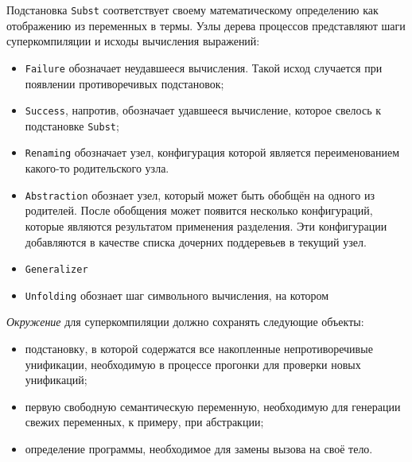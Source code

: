 Подстановка \lstinline{Subst} соответствует своему математическому определению как отображению из
переменных в термы.
Узлы дерева процессов представляют шаги суперкомпиляции и исходы вычисления выражений:
\begin{itemize}
\item \lstinline{Failure} обозначает неудавшееся вычисления. Такой исход
      случается при появлении противоречивых подстановок;
\item \lstinline{Success}, напротив, обозначает удавшееся вычисление, которое свелось к подстановке \lstinline{Subst};
\item \lstinline{Renaming} обозначает узел, конфигурация которой является переименованием какого-то родительского узла.
\item \lstinline{Abstraction} обознает узел, который может быть обобщён на одного из родителей.
      После обобщения может появится несколько конфигураций, которые являются результатом применения разделения.
      Эти конфигурации добавляются в качестве списка дочерних поддеревьев в текущий узел. 
\item \lstinline{Generalizer} 
\item \lstinline{Unfolding} обознает шаг символьного вычисления, на котором  
\end{itemize}


\emph{Окружение} для суперкомпиляции должно сохранять следующие объекты:
\begin{itemize}
\item подстановку, в которой содержатся все накопленные непротиворечивые унификации,
      необходимую в процессе прогонки для проверки новых унификаций;
\item первую свободную семантическую переменную, необходимую для генерации свежих переменных,
      к примеру, при абстракции;
\item определение программы, необходимое для замены вызова на своё тело.
\end{itemize}



